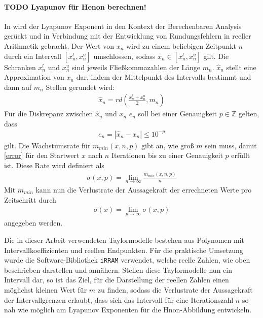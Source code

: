 \paragraph{TODO Lyapunov für Henon berechnen!}


In \cite{DBLP:spandl} wird der Lyapunov Exponent in den Kontext der Berechenbaren Analysis gerückt und in Verbindung mit der Entwicklung von Rundungsfehlern in reeller Arithmetik gebracht. Der Wert von $x_n$ wird zu einem beliebigen Zeitpunkt $n$ durch ein Intervall $[x_n^l,x_n^u]$ umschlossen, sodass $x_n \in [x_n^l,x_n^u]$ gilt. Die Schranken $x_n^l$ und $x_n^u$ sind jeweils Fließkommazahlen der Länge $m_n$. $\hat{x}_n$ stellt eine Approximation von $x_n$ dar, indem der Mittelpunkt des Intervalls bestimmt und dann auf $m_n$ Stellen gerundet wird:
\begin{align}
 \hat{x}_n = rd(\frac{x^l_n + x^u_n}{2}, m_n)
\end{align}
Für die Diskrepanz zwischen $\hat{x}_n$ und $x_n$ $e_n$ soll bei einer Genauigkeit $p \in \mathbb{Z}$ gelten, dass
\begin{align}
\label{error}
 e_n = |\hat{x}_n - x_n| \leq 10^{-p}
\end{align}
gilt. Die Wachstumsrate für $m_{min}(x,n,p)$ gibt an, wie groß $m$ sein muss, damit \ref{error} für den Startwert $x$ nach $n$ Iterationen bis zu einer Genauigkeit $p$ erfüllt ist. Diese Rate wird definiert als
\begin{align}
 \sigma(x,p) = \lim_{n \rightarrow \infty} \frac{m_{min}(x,n,p)}{n}
\end{align}
Mit $m_{min}$ kann nun die Verlustrate der Aussagekraft der errechneten Werte pro Zeitschritt durch
\begin{align}
 \sigma(x) = \lim_{p \rightarrow \infty} \sigma(x,p)
\end{align}
angegeben werden. 

Die in dieser Arbeit verwendeten Taylormodelle bestehen aus Polynomen mit Intervallkoeffizienten und reellen Endpunkten. Für die praktische Umsetzung wurde die Software-Bibliothek \verb+iRRAM+ \cite{Mller2009EnhancingIE} verwendet, welche reelle Zahlen, wie oben beschrieben darstellen und annähern. Stellen diese Taylormodelle nun ein Intervall dar, so ist das Ziel, für die Darstellung der reellen Zahlen einen möglichst kleinen Wert für $m$ zu finden, sodass die Verlustrate der Aussagekraft der Intervallgrenzen erlaubt, dass sich das Intervall für eine Iterationszahl $n$ so nah wie möglich am Lyapunov Exponenten für die H\e non-Abbildung entwickeln.  


 



 
